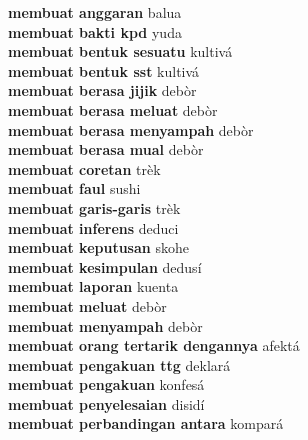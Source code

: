 \textbf{ membuat anggaran  } balua \\
\textbf{ membuat bakti kpd  } yuda \\
\textbf{ membuat bentuk sesuatu  } kultivá \\
\textbf{ membuat bentuk sst  } kultivá \\
\textbf{ membuat berasa jijik  } debòr \\
\textbf{ membuat berasa meluat  } debòr \\
\textbf{ membuat berasa menyampah  } debòr \\
\textbf{ membuat berasa mual  } debòr \\
\textbf{ membuat coretan  } trèk \\
\textbf{ membuat faul  } sushi \\
\textbf{ membuat garis-garis  } trèk \\
\textbf{ membuat inferens  } deduci \\
\textbf{ membuat keputusan  } skohe \\
\textbf{ membuat kesimpulan  } dedusí \\
\textbf{ membuat laporan  } kuenta \\
\textbf{ membuat meluat  } debòr \\
\textbf{ membuat menyampah  } debòr \\
\textbf{ membuat orang tertarik dengannya  } afektá \\
\textbf{ membuat pengakuan ttg  } deklará \\
\textbf{ membuat pengakuan  } konfesá \\
\textbf{ membuat penyelesaian  } disidí \\
\textbf{ membuat perbandingan antara  } kompará \\

